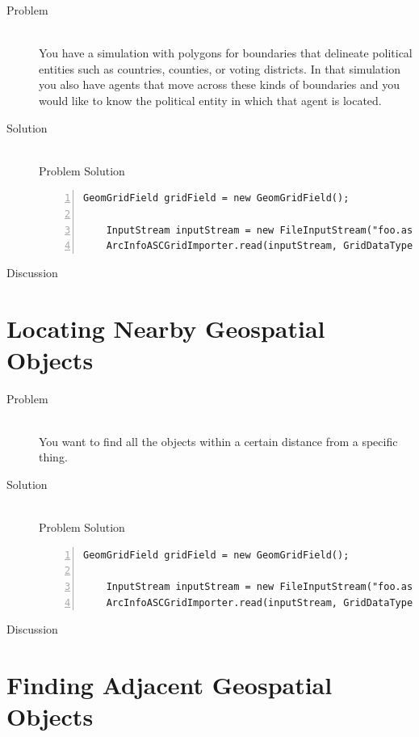\documentclass[twoside,10pt]{book}
\begin{document}
\begin{description}
\item[Problem]~\\
You have a simulation with polygons for boundaries that delineate political
entities such as countries,
counties, or voting districts.  In that simulation you also have
agents that move across these kinds of boundaries and you would like to know the
political entity in which that agent is located.

\item[Solution]~\\
Problem Solution
\begin{Verbatim}[frame=lines,framesep=5mm,numbers=left,commandchars=+\[\]]
	GeomGridField gridField = new GeomGridField();
	
	InputStream inputStream = new FileInputStream("foo.asc");
	ArcInfoASCGridImporter.read(inputStream, GridDataType.INTEGER, gridField);
\end{Verbatim}

\item[Discussion ]
\end{description}


\section{Locating Nearby Geospatial Objects}
\label{sec:nearbyobjects}

\begin{description}
\item[Problem]~\\
You want to find all the objects within a certain distance from a
specific thing.

\item[Solution]~\\
Problem Solution
\begin{Verbatim}[frame=lines,framesep=5mm,numbers=left,commandchars=+\[\]]
	GeomGridField gridField = new GeomGridField();
	
	InputStream inputStream = new FileInputStream("foo.asc");
	ArcInfoASCGridImporter.read(inputStream, GridDataType.INTEGER, gridField);
\end{Verbatim}

\item[Discussion ]
\end{description}


\section{Finding Adjacent Geospatial Objects}
\label{sec:findingadjacent}
\end{document}
